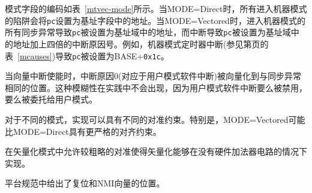 模式字段的编码如表~\ref{mtvec-mode}所示。当MODE=Direct时，所有进入机器模式的陷阱会将{\tt pc}设置为基址字段中的地址。当MODE=Vectored时，进入机器模式的所有同步异常导致{\tt pc}被设置为基址域中的地址，而中断导致{\tt pc}被设置为基址域中的地址加上四倍的中断原因号。例如，机器模式定时器中断(参见第页的表~\ref{mcauses})导致{\tt pc}被设置为BASE+{\tt 0x1c}。

\iffalse
\begin{commentary}
When vectored interrupts are enabled, interrupt cause 0, which corresponds to
user-mode software interrupts, are vectored to the same location as
synchronous exceptions.  This ambiguity does not arise in practice, since
user-mode software interrupts are either disabled or delegated to user mode.
\end{commentary}
\fi

\begin{commentary}
当向量中断使能时，中断原因0(对应于用户模式软件中断)被向量化到与同步异常相同的位置。这种模糊性在实践中不会出现，因为用户模式软件中断要么被禁用，要么被委托给用户模式。
\end{commentary}

\iffalse
An implementation may have different alignment constraints for
different modes.  In particular, MODE=Vectored may have stricter
alignment constraints than MODE=Direct.
\fi

对于不同的模式，实现可以具有不同的对准约束。特别是，MODE=Vectored可能比MODE=Direct具有更严格的对齐约束。

\iffalse
\begin{commentary}
  Allowing coarser alignments in Vectored mode enables vectoring to be
  implemented without a hardware adder circuit.
\end{commentary}
\fi

\begin{commentary}
  在矢量化模式中允许较粗略的对准使得矢量化能够在没有硬件加法器电路的情况下实现。
\end{commentary}

\iffalse
\begin{commentary}
Reset and NMI vector locations are given in a platform specification.
\end{commentary}
\fi

\begin{commentary}
平台规范中给出了复位和NMI向量的位置。
\end{commentary}

